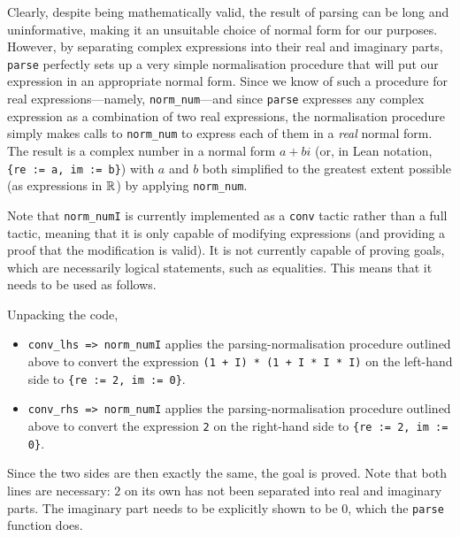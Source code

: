 Clearly, despite being mathematically valid, the result of parsing can be long and uninformative, making it an unsuitable choice of normal form for our purposes. However, by separating complex expressions into their real and imaginary parts, \lstinline|parse| perfectly sets up a very simple normalisation procedure that will put our expression in an appropriate normal form. Since we know of such a procedure for real expressions---namely, \lstinline|norm_num|---and since \lstinline|parse| expresses any complex expression as a combination of two real expressions, the normalisation procedure simply makes calls to \lstinline|norm_num| to express each of them in a \textit{real} normal form. The result is a complex number in a normal form $a + bi$ (or, in Lean notation, \lstinline|{re := a, im := b}|) with $a$ and $b$ both simplified to the greatest extent possible (as expressions in $\mathbb{R}$) by applying \lstinline|norm_num|.

Note that \lstinline|norm_numI| is currently implemented as a \lstinline|conv| tactic rather than a full tactic, meaning that it is only capable of modifying expressions (and providing a proof that the modification is valid). It is not currently capable of proving goals, which are necessarily logical statements, such as equalities. This means that it needs to be used as follows.


Unpacking the code,
\begin{itemize}
    \item \lstinline|conv_lhs => norm_numI| applies the parsing-normalisation procedure outlined above to convert the expression \lstinline|(1 + I) * (1 + I * I * I)| on the left-hand side to \lstinline|{re := 2, im := 0}|.
    \item \lstinline|conv_rhs => norm_numI| applies the parsing-normalisation procedure outlined above to convert the expression \lstinline|2| on the right-hand side to \lstinline|{re := 2, im := 0}|.
\end{itemize} 
Since the two sides are then exactly the same, the goal is proved. Note that both lines are necessary: $2$ on its own has not been separated into real and imaginary parts. The imaginary part needs to be explicitly shown to be $0$, which the \lstinline|parse| function does.

